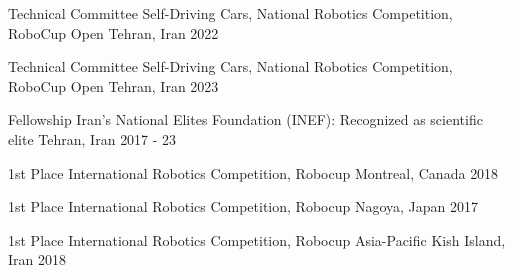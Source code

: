 




\begin{cvhonors}


\cvhonor
{Technical Committee} %
{Self-Driving Cars, National Robotics Competition, RoboCup Open} %
{Tehran, Iran} %
{2022} %


\cvhonor
{Technical Committee} %
{Self-Driving Cars, National Robotics Competition, RoboCup Open} %
{Tehran, Iran} %
{2023} %


\cvhonor
{Fellowship} %
{Iran’s National Elites Foundation (INEF): Recognized as scientific elite} %
{Tehran, Iran} %
{2017 - 23} %


\cvhonor
{1st Place} %
{International Robotics Competition, Robocup} %
{Montreal, Canada} %
{2018} %


\cvhonor
{1st Place} %
{International Robotics Competition, Robocup} %
{Nagoya, Japan} %
{2017} %


\cvhonor
{1st Place} %
{International Robotics Competition, Robocup Asia-Pacific} %
{Kish Island, Iran} %
{2018} %




\end{cvhonors}
